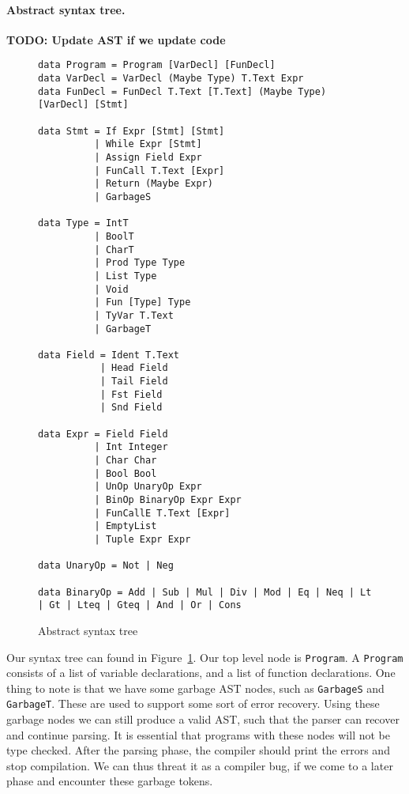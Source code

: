 \documentclass{report}
\begin{document}
\paragraph{Abstract syntax tree.}
\textbf{TODO: Update AST if we update code}
\begin{figure}
\begin{verbatim}
data Program = Program [VarDecl] [FunDecl]
data VarDecl = VarDecl (Maybe Type) T.Text Expr
data FunDecl = FunDecl T.Text [T.Text] (Maybe Type) [VarDecl] [Stmt]

data Stmt = If Expr [Stmt] [Stmt]
          | While Expr [Stmt]
          | Assign Field Expr
          | FunCall T.Text [Expr]
          | Return (Maybe Expr)
          | GarbageS

data Type = IntT
          | BoolT
          | CharT
          | Prod Type Type
          | List Type
          | Void
          | Fun [Type] Type
          | TyVar T.Text
          | GarbageT

data Field = Ident T.Text
           | Head Field
           | Tail Field
           | Fst Field
           | Snd Field

data Expr = Field Field
          | Int Integer
          | Char Char
          | Bool Bool
          | UnOp UnaryOp Expr
          | BinOp BinaryOp Expr Expr
          | FunCallE T.Text [Expr]
          | EmptyList
          | Tuple Expr Expr

data UnaryOp = Not | Neg

data BinaryOp = Add | Sub | Mul | Div | Mod | Eq | Neq | Lt | Gt | Lteq | Gteq | And | Or | Cons
\end{verbatim}
	\caption{Abstract syntax tree}\label{fig:ast}
\end{figure}
Our syntax tree can found in Figure~\ref{fig:ast}.
Our top level node is \texttt{Program}.
A \texttt{Program} consists of a list of variable declarations,
and a list of function declarations.
One thing to note is that we have some garbage AST nodes, such as \texttt{GarbageS} and \texttt{GarbageT}.
These are used to support some sort of error recovery.
Using these garbage nodes we can still produce a valid AST,
such that the parser can recover and continue parsing.
It is essential that programs with these nodes will not be type checked.
After the parsing phase, the compiler should print the errors and stop compilation.
We can thus threat it as a compiler bug, if we come to a later phase and encounter these garbage tokens.
\end{document}
